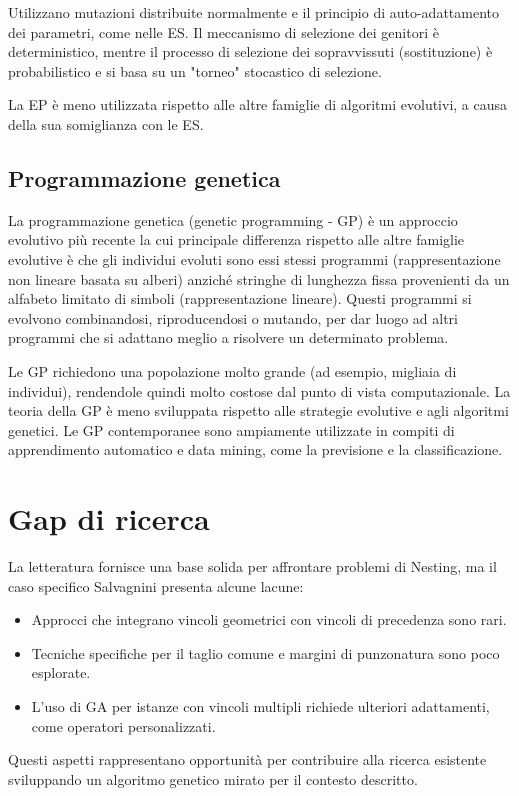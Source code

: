 Utilizzano mutazioni distribuite normalmente e il principio di auto-adattamento dei parametri, come nelle ES. Il meccanismo di selezione dei genitori è deterministico, mentre il processo di selezione dei sopravvissuti (sostituzione) è probabilistico e si basa su un "torneo" stocastico di selezione.

La EP è meno utilizzata rispetto alle altre famiglie di algoritmi evolutivi, a causa della sua somiglianza con le ES.

\subsection{Programmazione genetica}

La programmazione genetica (genetic programming - GP) è un approccio evolutivo più recente la cui principale differenza rispetto alle altre famiglie evolutive è che gli individui evoluti sono essi stessi programmi (rappresentazione non lineare basata su alberi) anziché stringhe di lunghezza fissa provenienti da un alfabeto limitato di simboli (rappresentazione lineare). Questi programmi si evolvono combinandosi, riproducendosi o mutando, per dar luogo ad altri programmi che si adattano meglio a risolvere un determinato problema.

Le GP richiedono una popolazione molto grande (ad esempio, migliaia di individui), rendendole quindi molto costose dal punto di vista computazionale. La teoria della GP è meno sviluppata rispetto alle strategie evolutive e agli algoritmi genetici. Le GP contemporanee sono ampiamente utilizzate in compiti di apprendimento automatico e data mining, come la previsione e la classificazione.

\section{Gap di ricerca}

La letteratura fornisce una base solida per affrontare problemi di Nesting, ma il caso specifico Salvagnini presenta alcune lacune:

\begin{itemize}
    \item Approcci che integrano vincoli geometrici con vincoli di precedenza sono rari.
    \item Tecniche specifiche per il taglio comune e margini di punzonatura sono poco esplorate.
    \item L'uso di GA per istanze con vincoli multipli richiede ulteriori adattamenti, come operatori personalizzati.
\end{itemize}

Questi aspetti rappresentano opportunità per contribuire alla ricerca esistente sviluppando un algoritmo genetico mirato per il contesto descritto.